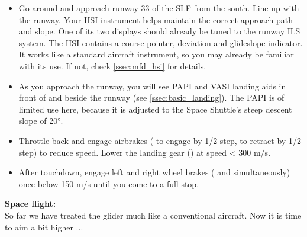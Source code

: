 \documentclass[Orbiter User Manual.tex]{subfiles}
\begin{document}
\begin{itemize}
\item Go around and approach runway 33 of the SLF from the south. Line up with the runway. Your HSI instrument helps maintain the correct approach path and slope. One of its two displays should already be tuned to the runway ILS system. The HSI contains a course pointer, deviation and glideslope indicator. It works like a standard aircraft instrument, so you may already be familiar with its use. If not, check \ref{ssec:mfd_hsi} for details.
\item As you approach the runway, you will see PAPI and VASI landing aids in front of and beside the runway (see \ref{ssec:basic_landing}). The PAPI is of limited use here, because it is adjusted to the Space Shuttle's steep descent slope of 20°.
\item Throttle back and engage airbrakes ( to engage by 1/2 step, \Alt{} to retract by 1/2 step) to reduce speed. Lower the landing gear () at speed < 300 m/s.
\item After touchdown, engage left and right wheel brakes (\keystroke{,} and  simultaneously) once below 150 m/s until you come to a full stop.
\end{itemize}

\noindent
\textbf{Space flight:}\\
So far we have treated the glider much like a conventional aircraft. Now it is time to aim a bit higher ...
\end{document}
